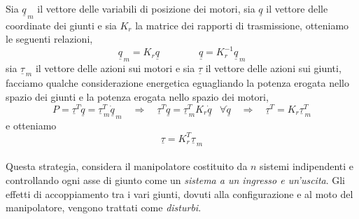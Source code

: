 \paragraph{}
Sia $\underline{q}_{\,m}$ il vettore delle variabili di posizione dei motori, sia $\underline{q}$ il vettore delle coordinate dei giunti e sia $K_r$ la matrice dei rapporti di trasmissione, otteniamo le seguenti relazioni,
\begin{equation}
	\underline{q}_{\,m} = K_r \underline{q} \qquad \qquad \underline{q} = K_r^{-1} \underline{q}_{\,m}
\end{equation}
sia $\underline{\tau}_{\,m}$ il vettore delle azioni sui motori e sia $\underline{\tau}$ il vettore delle azioni sui giunti, facciamo qualche considerazione energetica eguagliando la potenza erogata nello spazio dei giunti e la potenza erogata nello spazio dei motori,
\begin{equation*}
	P = \underline{\tau}^T \underline{\dot{q}} = \underline{\tau}_{\,m}^T \underline{\dot{q}}_{\,m} \quad \Rightarrow \quad \underline{\tau}^T \underline{\dot{q}} = \underline{\tau}_{\,m}^T K_r \underline{\dot{q}} \;\;\; \forall \underline{\dot{q}} \quad \Rightarrow \quad \underline{\tau}^T = K_r \underline{\tau}_{\,m}^T 
\end{equation*}
e otteniamo
\begin{equation}
	\underline{\tau}= K_r^T \underline{\tau}_{\,m}
\end{equation}

\paragraph{}
Questa strategia, considera il manipolatore costituito da $n$ sistemi indipendenti e controllando ogni asse di giunto come un \emph{sistema a un ingresso e un'uscita}. Gli effetti di accoppiamento tra i vari giunti, dovuti alla configurazione e al moto del manipolatore, vengono trattati come \emph{disturbi}.

